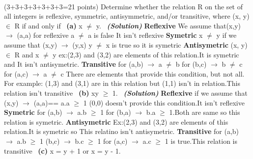 \documentclass[a4 paper]{article}
\numberwithin{equation}{section}
\newcommand{\problem}[2]{~\\\fbox{\textbf{Problem #1}}\hfill (#2 points)\newline\newline}
\newcommand{\subproblem}[1]{~\newline\textbf{(#1)}}
\newcommand{\solution}{~\newline\textbf{\textit{(Solution)}} }
\newcommand{\0}{\mathbf{0}}
\begin{document}
\newpage
\problem{4: Relations}{3+3+3+3+3+3+3=21}
Determine whether the relation R on the set of all integers is reflexive, symmetric, antisymmetric, and/or transitive, where (x, y) $\in$ R if and only if
\subproblem{a} x $\neq$ y.
\solution
\newline
\textbf{Reflexive}\newline
We assume that(x,y) $\rightarrow$ (a,a) for reflexive a $\neq$ a is false\newline
It isn't reflexive\newline
\textbf{Symetric}\newline
x $\neq$ y if we assume that (x,y)  $\rightarrow$  (y,x) y $\neq$ x is true so it is symetric\newline
\textbf{Antisymetric}\newline
(x, y) $\in$ R and x  $\neq$ y ex:(2,3) and (3,2) are elements of this relation.It is symetric and It isn't antisymetric.\newline
\textbf{Transitive} \newline
for (a,b)  $\rightarrow$  a $\neq$ b for (b,c)  $\rightarrow$  b $\neq$ c for (a,c) $\rightarrow$  a $\neq$ c\newline
There are elements that provide this condition, but not all. For example:
(1,3) and (3,1) are in this relation but (1,1) isn't  in relation.This relation isn't transitive
\newline
\subproblem{b} xy $\geq$ 1.
\solution
\newline
\textbf{Reflexive}\newline
if we assume that (x,y) $\rightarrow$ (a,a)== a.a $\geq$ 1\newline
(0,0) doesn't provide this condition.It isn't reflexive\newline
\textbf{Symetric}\newline
for (a,b)  $\rightarrow$  a.b $\geq$ 1 for (b,a)  $\rightarrow$  b.a $\geq$ 1.Both are  same so this relation is symetric.\newline
\textbf{Antisymetric}\newline
Ex:(2,3) and (3,2) are elements of this relation.It is symetric so This relatino isn't antisymetric.\newline
\textbf{Transitive}\newline
for (a,b)  $\rightarrow$  a.b $\geq$ 1 (b,c) $\rightarrow$  b.c $\geq$ 1 for (a,c) $\rightarrow$  a.c $\geq$ 1 is true.This relation is transitive\newline
\newline
\subproblem{c} x = y + 1 or x = y - 1.
\end{document}
